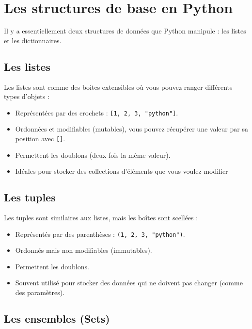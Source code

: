 \documentclass[
  11pt,
  letterpaper,
  open=any,
  twoside=false,
  french]{scrbook}
\begin{document}
\section{Les structures de base en
Python}\label{les-structures-de-base-en-python}

Il y a essentiellement deux structures de données que Python manipule :
les listes et les dictionnaires.

\subsection{Les listes}\label{les-listes}

Les listes sont comme des boites extensibles où vous pouvez ranger
différents types d'objets :

\begin{itemize}
\item
  Représentées par des crochets : \texttt{{[}1,\ 2,\ 3,\ "python"{]}}.
\item
  Ordonnées et modifiables (mutables), vous pouvez récupérer une valeur
  par sa position avec \texttt{{[}{]}}.
\item
  Permettent les doublons (deux fois la même valeur).
\item
  Idéales pour stocker des collections d'éléments que vous voulez
  modifier
\end{itemize}

\subsection{Les tuples}\label{les-tuples}

Les tuples sont similaires aux listes, mais les boîtes sont scellées :

\begin{itemize}
\item
  Représentés par des parenthèses : \texttt{(1,\ 2,\ 3,\ "python")}.
\item
  Ordonnés mais non modifiables (immutables).
\item
  Permettent les doublons.
\item
  Souvent utilisé pour stocker des données qui ne doivent pas changer
  (comme des paramètres).
\end{itemize}

\subsection{Les ensembles (Sets)}\label{les-ensembles-sets}
\end{document}

